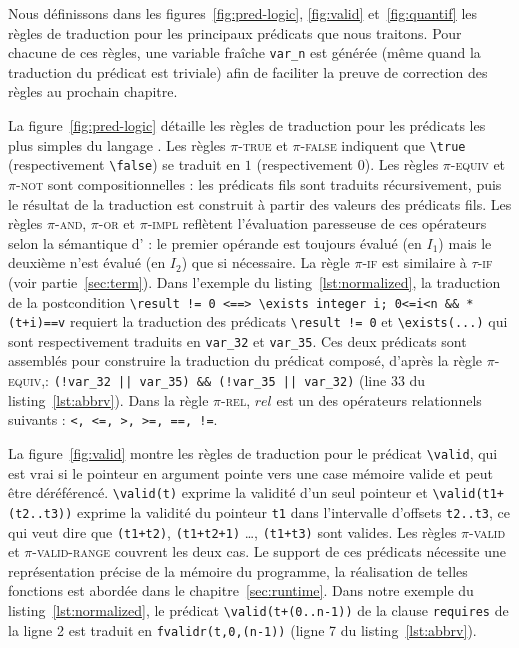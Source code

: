 Nous définissons dans les figures~\ref{fig:pred-logic}, \ref{fig:valid}
et~\ref{fig:quantif} les règles de traduction pour les principaux
prédicats \eacsl que nous traitons.
Pour chacune de ces règles, une variable fraîche \lstinline'var_n' est générée
(même quand la traduction du prédicat est triviale) afin de faciliter la preuve
de correction des règles au prochain chapitre.



La figure~\ref{fig:pred-logic} détaille les règles de traduction pour les
prédicats les plus simples du langage \eacsl.
Les règles \textsc{$\pi$-true} et \textsc{$\pi$-false} indiquent que
\lstinline'\true' (respectivement \lstinline'\false') se traduit en $1$
(respectivement $0$).
Les règles \textsc{$\pi$-equiv} et \textsc{$\pi$-not} sont compositionnelles :
les prédicats fils sont traduits récursivement, puis le résultat de la
traduction est construit à partir des valeurs des prédicats fils.
Les règles \textsc{$\pi$-and}, \textsc{$\pi$-or} et \textsc{$\pi$-impl}
reflètent l'évaluation paresseuse de ces opérateurs selon la sémantique d'\eacsl
: le premier opérande est toujours évalué (en $I_1$) mais le deuxième n'est
évalué (en $I_2$) que si nécessaire.
La règle \textsc{$\pi$-if} est similaire à \textsc{$\tau$-if} (voir
partie~\ref{sec:term}).
Dans l'exemple du listing~\ref{lst:normalized}, la traduction de la
postcondition
\lstinline{\result != 0 <==> \exists integer i; 0<=i<n && *(t+i)==v} requiert
la traduction des prédicats \lstinline|\result != 0| et
\lstinline{\exists(...)} qui sont respectivement traduits en \lstinline|var_32|
et \lstinline|var_35|.
Ces deux prédicats sont assemblés pour construire la traduction du prédicat
composé, d'après la règle \textsc{$\pi$-equiv},:
\lstinline{(!var_32 || var_35) && (!var_35 || var_32)} (line 33 du
listing~\ref{lst:abbrv}).
Dans la règle \textsc{$\pi$-rel}, $rel$ est un des opérateurs relationnels
suivants : \lstinline[style=c]{<, <=, >, >=, ==, !=}.



La figure~\ref{fig:valid} montre les règles de traduction pour le prédicat
\lstinline|\valid|, qui est vrai si le pointeur en argument pointe vers une
case mémoire valide et peut être déréférencé.
\lstinline'\valid(t)' exprime la validité d'un seul pointeur et
\lstinline'\valid(t1+(t2..t3))' exprime la validité du pointeur \lstinline't1'
dans l'intervalle d'offsets \lstinline't2..t3', ce qui veut dire que
\lstinline'(t1+t2)', \lstinline'(t1+t2+1)' \dots, \lstinline'(t1+t3)' sont
valides.
Les règles \textsc{$\pi$-valid} et \textsc{$\pi$-valid-range} couvrent les deux
cas.
Le support de ces prédicats nécessite une représentation précise de la mémoire
du programme, la réalisation de telles fonctions est abordée dans le
chapitre~\ref{sec:runtime}.
Dans notre exemple du listing~\ref{lst:normalized}, le prédicat
\lstinline|\valid(t+(0..n-1))| de la clause \lstinline|requires| de la ligne 2
est traduit en \lstinline[style=c]|fvalidr(t,0,(n-1))| (ligne 7 du
listing~\ref{lst:abbrv}).

